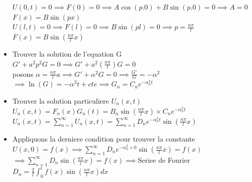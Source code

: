 \documentclass[12pt]{book}
\begin{document}
\begin{itemize}
                    $U(0,t) =0 \implies F(0) =0 \implies A\cos(p.0)+B\sin(p.0) = 0 \implies A =0 $ \\
                    $F(x) = B\sin(px)$
                    $U(l,t)=0 \implies F(l) =0 \implies B\sin(pl)=0 \implies p =\frac{n\pi}{l} $ \\ 
                    $F(x)=B\sin(\frac{n\pi}{l}x)$
                \item Trouver la solution de l'equation G \\
                    $G'+a^2p^2G=0 \implies G'+a^2(\frac{n\pi}{l})G=0 $ \\
                    posons $\alpha = \frac{n\pi}{l}a \implies G' + \alpha^2G =0 \implies \frac{G'}{G}=-\alpha^2 $\\
                    $\implies \ln(G) = -\alpha^2t +cte \implies G_n =C_ne^{-\alpha_n^2t}$
                \item Trouver la solution particuliere $U_n(x,t)$ \\
                    $ U_n(x,t) = F_n(x)G_n(t) = B_n\sin(\frac{n\pi}{l}x)\times C_ne^{-\alpha^2_nt} $\\
                    $ U_n(x,t) = \sum^\infty_{n=1}U_n(x,t) = \sum^\infty_{n=1}D_ne^{-\alpha_n^2t}\sin(\frac{n\pi}{l}x)$
                \item Appliquons la derniere condition pour trouver la constante \\
                    $ U(x,0)=f(x)\implies \sum^\infty_{n=1}D_ne^{-\alpha_n^2\times 0}\sin(\frac{n\pi}{l}x)=f(x)  $ \\
                    $ \implies \sum^\infty_{n=1}D_n\sin(\frac{n\pi}{l}x) = f(x) \implies $Seriee de Fourier \\
                    $D_n = \frac{2}{l}\int^l_0f(x)\sin(\frac{n\pi}{l}x)dx$
            \end{itemize}
\end{document}
